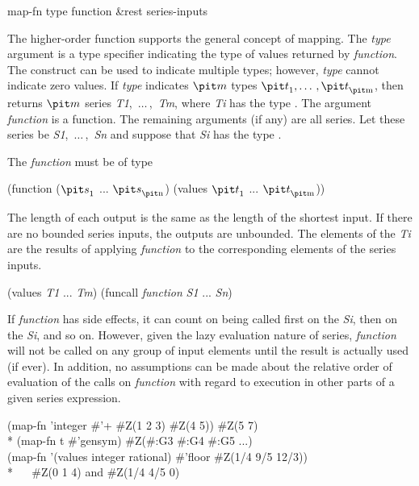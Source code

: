 \begin{defun}[Function]
map-fn type function &rest series-inputs

The higher-order function  supports the general concept of
mapping.   The {\it type} argument is a type specifier indicating
the type of values returned by {\it function}.  The 
construct can be used to indicate multiple types; however, {\it type}
cannot indicate zero values.  If {\it type} indicates ${\it m}$ types
${\it t}_1, \ldots\,, {\it t}_{\hbox{\scriptsize\it m}}$,
then  returns ${\it m}$ series
{\it T1},~$\ldots\,$,~{\it Tm}, where {\it Ti} has the
type .
The argument
{\it function} is a function.   The remaining arguments (if any) are all
series.  Let these series be {\it S1},~$\ldots\,$,~{\it Sn} and suppose that
{\it Si} has the type .

The {\it function} must be of type
\begin{lisp}
(function (${\it s}_1$ ... ${\it s}_{\hbox{\scriptsize\it n}}$) (values ${\it t}_1$ ... ${\it t}_{\hbox{\scriptsize\it m}}$))
\end{lisp}

The length of each output is the same as the length of the shortest input.
If there are no bounded series inputs, the outputs are unbounded.
The elements of the {\it Ti} are the results of applying {\it function} to
the corresponding elements of the series inputs.
\begin{lisp}
(values {\it T1} ... {\it Tm}) {\EQ} (funcall {\it function} {\it S1} ... {\it Sn})
\end{lisp}

If {\it function} has side effects, it can count on being called first on
the {\it Si}, then on the {\it Si}, and so on.  However, given
the lazy evaluation nature of series, {\it function} will not be called on
any group of input elements until the result is actually used (if ever).
In addition, no assumptions can be made about the relative order of
evaluation of the calls on {\it function} with regard to execution in other parts of a
given series expression.
\begin{lisp}
(map-fn 'integer \#'+ \#Z(1 2 3) \#Z(4 5)) {\EV} \#Z(5 7) \\*
(map-fn t \#'gensym) {\EV} \#Z(\#:G3 \#:G4 \#:G5 ...) \\
(map-fn '(values integer rational) \#'floor \#Z(1/4 9/5 12/3)) \\*
~~{\EV} \#Z(0 1 4) {\rm and} \#Z(1/4 4/5 0)
\end{lisp}


\end{defun}
